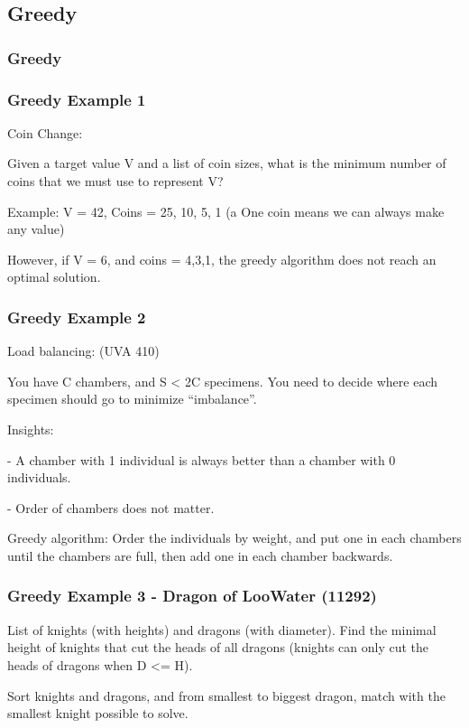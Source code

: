 \documentclass{beamer}
\begin{document}
\subsection{Greedy}
\begin{frame}
  \frametitle{Greedy}



\end{frame}

\begin{frame}
  \frametitle{Greedy Example 1}
  Coin Change:

  Given a target value V and a list of coin sizes, what is the minimum number 
  of coins that we must use to represent V?

  Example: V = 42, Coins = 25, 10, 5, 1 (a One coin means we can always make any value)

  However, if V = 6, and coins = 4,3,1, the greedy algorithm does not
  reach an optimal solution.
\end{frame}

\begin{frame}
  \frametitle{Greedy Example 2}
  Load balancing: (UVA 410)

  You have C chambers, and S < 2C specimens. You need to decide where
  each specimen should go to minimize ``imbalance''.

  Insights:

  - A chamber with 1 individual is always better than a chamber with 0
  individuals.

  - Order of chambers does not matter.


  Greedy algorithm: Order the individuals by weight, and 
  put one in each chambers until the chambers are full, then add one
  in each chamber backwards.
\end{frame}

\begin{frame}
  \frametitle{Greedy Example 3 - Dragon of LooWater (11292)}
  List of knights (with heights) and dragons (with diameter). Find the 
  minimal height of knights that cut the heads of all dragons 
  (knights can only cut the heads of dragons when D <= H).

  Sort knights and dragons, and from smallest to biggest dragon, 
  match with the smallest knight possible to solve.
\end{frame}
\end{document}
